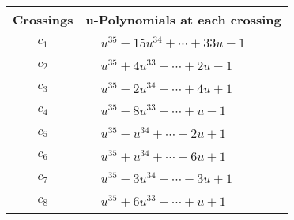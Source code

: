 \documentclass[1p]{elsarticle_modified}
\theoremstyle{definition}
\begin{document}
\begin{tabular}{m{50pt}|m{274pt}}
Crossings & \hspace{64pt}u-Polynomials at each crossing \\
\hline $$\begin{aligned}c_{1}\end{aligned}$$&$\begin{aligned}
&u^{35}-15 u^{34}+\cdots+33 u-1
\end{aligned}$\\
\hline $$\begin{aligned}c_{2}\end{aligned}$$&$\begin{aligned}
&u^{35}+4 u^{33}+\cdots+2 u-1
\end{aligned}$\\
\hline $$\begin{aligned}c_{3}\end{aligned}$$&$\begin{aligned}
&u^{35}-2 u^{34}+\cdots+4 u+1
\end{aligned}$\\
\hline $$\begin{aligned}c_{4}\end{aligned}$$&$\begin{aligned}
&u^{35}-8 u^{33}+\cdots+u-1
\end{aligned}$\\
\hline $$\begin{aligned}c_{5}\end{aligned}$$&$\begin{aligned}
&u^{35}- u^{34}+\cdots+2 u+1
\end{aligned}$\\
\hline $$\begin{aligned}c_{6}\end{aligned}$$&$\begin{aligned}
&u^{35}+u^{34}+\cdots+6 u+1
\end{aligned}$\\
\hline $$\begin{aligned}c_{7}\end{aligned}$$&$\begin{aligned}
&u^{35}-3 u^{34}+\cdots-3 u+1
\end{aligned}$\\
\hline $$\begin{aligned}c_{8}\end{aligned}$$&$\begin{aligned}
&u^{35}+6 u^{33}+\cdots+u+1
\end{aligned}$\\

\end{tabular}
\end{document}
